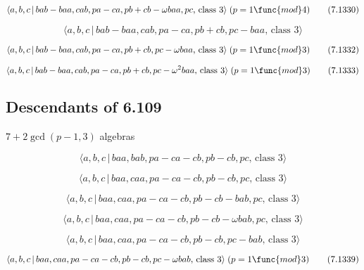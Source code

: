 \documentclass[10pt]{article}
\begin{document}
\begin{equation}
\langle a,b,c\,|\,bab-baa,cab,pa-ca,pb+cb-\omega baa,pc,\,\text{class }%
3\rangle \;(p=1\func{mod}4)  \tag{7.1330}
\end{equation}

\begin{equation}
\langle a,b,c\,|\,bab-baa,cab,pa-ca,pb+cb,pc-baa,\,\text{class }3\rangle 
\tag{7.1331}
\end{equation}

\begin{equation}
\langle a,b,c\,|\,bab-baa,cab,pa-ca,pb+cb,pc-\omega baa,\,\text{class }%
3\rangle \;(p=1\func{mod}3)  \tag{7.1332}
\end{equation}

\begin{equation}
\langle a,b,c\,|\,bab-baa,cab,pa-ca,pb+cb,pc-\omega ^{2}baa,\,\text{class }%
3\rangle \;(p=1\func{mod}3)  \tag{7.1333}
\end{equation}

\subsection{Descendants of 6.109}

$7+2\gcd (p-1,3)$ algebras

\begin{equation}
\langle a,b,c\,|\,baa,bab,pa-ca-cb,pb-cb,pc,\,\text{class }3\rangle 
\tag{7.1334}
\end{equation}

\begin{equation}
\langle a,b,c\,|\,baa,caa,pa-ca-cb,pb-cb,pc,\,\text{class }3\rangle 
\tag{7.1335}
\end{equation}

\begin{equation}
\langle a,b,c\,|\,baa,caa,pa-ca-cb,pb-cb-bab,pc,\,\text{class }3\rangle 
\tag{7.1336}
\end{equation}

\begin{equation}
\langle a,b,c\,|\,baa,caa,pa-ca-cb,pb-cb-\omega bab,pc,\,\text{class }%
3\rangle  \tag{7.1337}
\end{equation}

\begin{equation}
\langle a,b,c\,|\,baa,caa,pa-ca-cb,pb-cb,pc-bab,\,\text{class }3\rangle 
\tag{7.1338}
\end{equation}

\begin{equation}
\langle a,b,c\,|\,baa,caa,pa-ca-cb,pb-cb,pc-\omega bab,\,\text{class }%
3\rangle \;(p=1\func{mod}3)  \tag{7.1339}
\end{equation}
\end{document}

